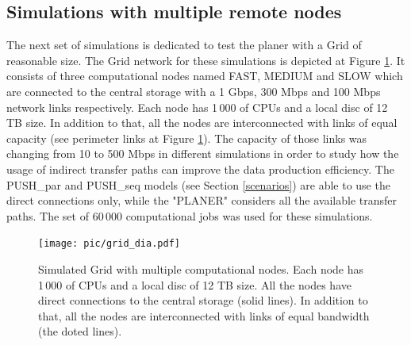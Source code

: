 \documentclass{svjour3}                     %
\begin{document}
\subsection{Simulations with multiple remote nodes}

The next set of simulations is dedicated to test the planer with a Grid of reasonable size. The Grid network for these simulations is depicted at Figure \ref{simulated_grid}. It consists of three computational nodes named FAST, MEDIUM and SLOW which are connected to the central storage with a 1 Gbps, 300 Mbps and 100 Mbps network links respectively. Each node has 1\,000 of CPUs and a local disc of 12 TB size. In addition to that, all the nodes are interconnected with links of equal capacity (see perimeter links at Figure \ref{simulated_grid}). The capacity of those links was changing from 10 to 500 Mbps in different simulations in order to study how the usage of indirect transfer paths can improve the data production efficiency. The PUSH\_par and PUSH\_seq models (see Section \ref{scenarios}) are able to use the direct connections only, while the "PLANER" considers all the available transfer paths. The set of 60\,000 computational jobs was used for these simulations.
\begin{figure}
  \begin{center}
    \texttt{[image: pic/grid\_dia.pdf]}
    \caption{Simulated Grid with multiple computational nodes. Each node has 1\,000 of CPUs and a local disc of 12 TB size. All the nodes have direct connections to the central storage (solid lines). In addition to that, all the nodes are interconnected with links of equal bandwidth (the doted lines).}
    \label{simulated_grid}	
  \end{center}  
\end{figure}
\end{document}
